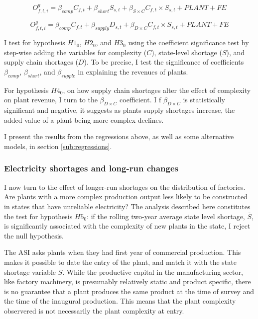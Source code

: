 \documentclass[11pt]{article}
\begin{document}
\begin{equation}
\label{eqn:int_shortages}
O^{g}_{f,t,i} = \beta_{comp} C_{f,t} + \beta_{short} S_{s,t} + \beta_{S\times C} C_{f,t} \times S_{s,t} + PLANT + FE
\end{equation}

\begin{equation}
\label{eqn:int_supply}
O^{g}_{f,t,i} = \beta_{comp} C_{f,t} + \beta_{supply} D_{s,t} + \beta_{D\times C} C_{f,t} \times S_{s,t} + PLANT + FE
\end{equation}

I test for hypothesis $H1_0$, $H2_0$, and $H3_0$ using the coefficient significance test by step-wise adding the variables for complexity ($C$), state-level shortage ($S$), and supply chain shortages ($D$). To be precise, I test the significance of coefficients $\beta_{comp}$, $\beta_{short}$, and $\beta_{supple}$ in explaining the revenues of plants.

For hypothesis $H4_0$, on how supply chain shortages alter the effect of complexity on plant revenue, I turn to the $\beta_{D \times C}$ coefficient. I f $\beta_{D \times C}$ is statistically significant and negative, it suggests as plants supply shortages increase, the added value of a plant being more complex declines.

I present the results from the regressions above, as well as some alternative models, in section \ref{sub:regressions}.

\subsubsection{Electricity shortages and long-run changes}\label{sub:entry_emp_strat}

I now turn to the effect of longer-run shortages on the distribution of factories. Are plants with a more complex production output less likely to be constructed in states that have unreliable electricity? The analysis described here constitutes the test for hypothesis $H5_0$: if the rolling two-year average state level shortage, $\bar{S}$, is significantly associated with the complexity of new plants in the state, I reject the null hypothesis. 

The ASI asks plants when they had first year of commercial production. This makes it possible to date the entry of the plant, and match it with the state shortage variable $S$. While the productive capital in the manufacturing sector, like factory machinery, is presumably relatively static and product specific, there is no guarantee that a plant produces the same product at the time of survey and the time of the inaugural production. This means that the plant complexity observered is not necessarily the plant complexity at entry. 
\end{document}
